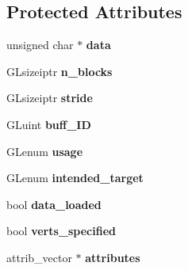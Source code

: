 \subsection*{Protected Attributes}
\begin{DoxyCompactItemize}
\item 
\hypertarget{classgfx_1_1buffer_ab5b0ca79b5c3058d3cfa707f029f9119}{unsigned char $\ast$ {\bfseries data}}\label{classgfx_1_1buffer_ab5b0ca79b5c3058d3cfa707f029f9119}

\item 
\hypertarget{classgfx_1_1buffer_abeb05ba5f2a55cd25f88ad70bd05a8b8}{G\-Lsizeiptr {\bfseries n\-\_\-blocks}}\label{classgfx_1_1buffer_abeb05ba5f2a55cd25f88ad70bd05a8b8}

\item 
\hypertarget{classgfx_1_1buffer_a5bb5ae77f00821dde719f2ec03b5d0e6}{G\-Lsizeiptr {\bfseries stride}}\label{classgfx_1_1buffer_a5bb5ae77f00821dde719f2ec03b5d0e6}

\item 
\hypertarget{classgfx_1_1buffer_accc9828ba943b976549f07ae06e05e35}{G\-Luint {\bfseries buff\-\_\-\-I\-D}}\label{classgfx_1_1buffer_accc9828ba943b976549f07ae06e05e35}

\item 
\hypertarget{classgfx_1_1buffer_ab00ffc79a1d96212511f90569a4e7bcc}{G\-Lenum {\bfseries usage}}\label{classgfx_1_1buffer_ab00ffc79a1d96212511f90569a4e7bcc}

\item 
\hypertarget{classgfx_1_1buffer_a891c9e8489ada44e36520a79edd6e1fa}{G\-Lenum {\bfseries intended\-\_\-target}}\label{classgfx_1_1buffer_a891c9e8489ada44e36520a79edd6e1fa}

\item 
\hypertarget{classgfx_1_1buffer_a2364b41ea3e767a2605002964d043e0c}{bool {\bfseries data\-\_\-loaded}}\label{classgfx_1_1buffer_a2364b41ea3e767a2605002964d043e0c}

\item 
\hypertarget{classgfx_1_1buffer_acd441d5dda07ce4b5f48c797fc50f060}{bool {\bfseries verts\-\_\-specified}}\label{classgfx_1_1buffer_acd441d5dda07ce4b5f48c797fc50f060}

\item 
\hypertarget{classgfx_1_1buffer_a42f2bd5d967e8aad51333e76862a3547}{attrib\-\_\-vector $\ast$ {\bfseries attributes}}\label{classgfx_1_1buffer_a42f2bd5d967e8aad51333e76862a3547}

\end{DoxyCompactItemize}
